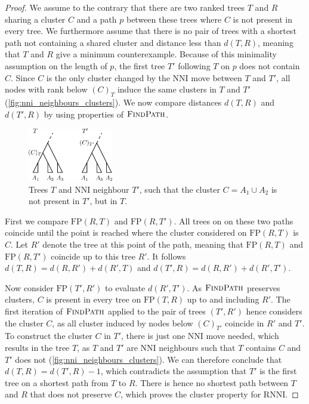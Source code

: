 \documentclass[11pt]{amsart}
\newcommand{\rnni}{\mathrm{RNNI}}
\newcommand{\findpath}{\textsc{FindPath}}
\newcommand{\nni}{\mathrm{NNI}}
\newcommand{\fp}{\mathrm{FP}}
\begin{document}
\begin{proof}
	We assume to the contrary that there are two ranked trees $T$ and $R$ sharing a cluster $C$ and a path $p$ between these trees where $C$ is not present in every tree.
	We furthermore assume that there is no pair of trees with a shortest path not containing a shared cluster and distance less than $d(T,R)$, meaning that $T$ and $R$ give a minimum counterexample.
	Because of this minimality assumption on the length of $p$, the first tree $T'$ following $T$ on $p$ does not contain $C$.
	Since $C$ is the only cluster changed by the $\nni$ move between $T$ and $T'$, all nodes with rank below $(C)_T$ induce the same clusters in $T$ and $T'$ (\autoref{fig:nni_neighbours_clusters}).
	We now compare distances $d(T,R)$ and $d(T',R)$ by using properties of $\findpath$.

	\begin{figure}[ht]
		\includegraphics[width=0.33\textwidth]{nni_neighbours_clusters.eps}
		\caption{Trees $T$ and $\nni$ neighbour $T'$, such that the cluster $C = A_1 \cup A_2$ is not present in $T'$, but in $T$.}
		\label{fig:nni_neighbours_clusters}
	\end{figure}

	First we compare $\fp(R,T)$ and $\fp(R,T')$.
	All trees on on these two paths coincide until the point is reached where the cluster considered on $\fp(R,T)$ is $C$.
	Let $R'$ denote the tree at this point of the path, meaning that $\fp(R,T)$ and $\fp(R,T')$ coincide up to this tree $R'$.
	It follows $d(T,R) = d(R,R') + d(R', T)$ and $d(T',R) = d(R,R') + d(R', T')$.

	Now consider $\fp(T', R')$ to evaluate $d(R', T')$.
	As $\findpath$ preserves clusters, $C$ is present in every tree on $\fp(T,R)$ up to and including $R'$.
	The first iteration of $\findpath$ applied to the pair of trees $(T',R')$ hence considers the cluster $C$, as all cluster induced by nodes below $(C)_{T'}$ coincide in $R'$ and $T'$.
	To construct the cluster $C$ in $T'$, there is just one $\nni$ move needed, which results in the tree $T$, as $T$ and $T'$ are $\nni$ neighbours such that $T$ contains $C$ and $T'$ does not (\autoref{fig:nni_neighbours_clusters}).
	We can therefore conclude that $d(T,R) = d(T',R) - 1$, which contradicts the assumption that $T'$ is the first tree on a shortest path from $T$ to $R$.
	There is hence no shortest path between $T$ and $R$ that does not preserve $C$, which proves the cluster property for $\rnni$.
\end{proof}
\end{document}
